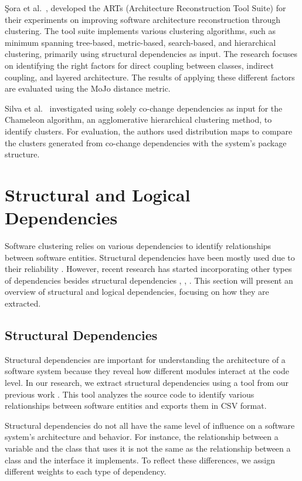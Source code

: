\documentclass[12pt, a4paper, twoside]{report}
\begin{document}
Şora et al.~\cite{b12}, \cite{b19} developed the ARTs (Architecture Reconstruction Tool Suite) for their experiments on improving software architecture reconstruction through clustering. The tool suite implements various clustering algorithms, such as minimum spanning tree-based, metric-based, search-based, and hierarchical clustering, primarily using structural dependencies as input. The research focuses on identifying the right factors for direct coupling between classes, indirect coupling, and layered architecture. The results of applying these different factors are evaluated using the MoJo distance metric.

Silva et al.~\cite{b16} investigated using solely co-change dependencies as input for the Chameleon algorithm, an agglomerative hierarchical clustering method, to identify clusters. For evaluation, the authors used distribution maps to compare the clusters generated from co-change dependencies with the system's package structure.



\section{Structural and Logical Dependencies}
\label{sec:dependencies}

Software clustering relies on various dependencies to identify relationships between software entities. Structural dependencies have been mostly used due to their reliability \cite{b12}. However, recent research has started incorporating other types of dependencies besides structural dependencies \cite{b13}, \cite{b14}, \cite{b18}. This section will present an overview of structural and logical dependencies, focusing on how they are extracted.

\subsection{Structural Dependencies}

Structural dependencies are important for understanding the architecture of a software system because they reveal how different modules interact at the code level. In our research, we extract structural dependencies using a tool from our previous work \cite{b4}. This tool analyzes the source code to identify various relationships between software entities and exports them in CSV format.

Structural dependencies do not all have the same level of influence on a software system’s architecture and behavior. For instance, the relationship between a variable and the class that uses it is not the same as the relationship between a class and the interface it implements. To reflect these differences, we assign different weights to each type of dependency.
\end{document}
